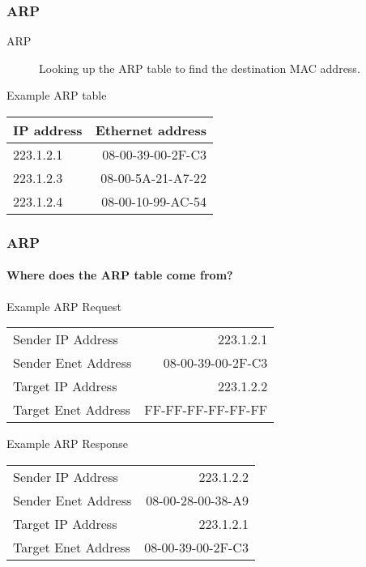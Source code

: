 \documentclass[hyperref={xetex,colorlinks,linkcolor=blue},green,compress]{beamer}
\begin{document}
  \begin{frame}
    \frametitle{ARP}
    \begin{description}
    \item[ARP] Looking up the ARP table to find the destination MAC address.
    \end{description}    
    \begin{exampleblock}{Example ARP table}
      \begin{center}
        \begin{tabular}{|lr|}
          \hline
          IP address & Ethernet address\\\hline
          223.1.2.1  & 08-00-39-00-2F-C3\\
          223.1.2.3  & 08-00-5A-21-A7-22\\
          223.1.2.4  & 08-00-10-99-AC-54\\\hline
        \end{tabular}
      \end{center}
    \end{exampleblock}
  \end{frame}

  \begin{frame}
    \frametitle{ARP} \framesubtitle{Where does the ARP table come
      from?}
    \begin{exampleblock}{Example ARP Request}
      \begin{center}
        \begin{tabular}{|lr|}
        \hline
        Sender IP Address & 223.1.2.1\\
        Sender Enet Address & 08-00-39-00-2F-C3\\\hline
        Target IP Address & 223.1.2.2\\
        Target Enet Address & FF-FF-FF-FF-FF-FF\\\hline
      \end{tabular}
    \end{center}
    \end{exampleblock}

    \begin{exampleblock}{Example ARP Response}
      \begin{center}
        \begin{tabular}{|lr|}
          \hline
          Sender IP Address &  223.1.2.2\\
          Sender Enet Address & 08-00-28-00-38-A9\\\hline
          Target IP Address & 223.1.2.1\\
          Target Enet Address & 08-00-39-00-2F-C3\\\hline
        \end{tabular}
      \end{center}
    \end{exampleblock}
  \end{frame}
  
\end{document}
